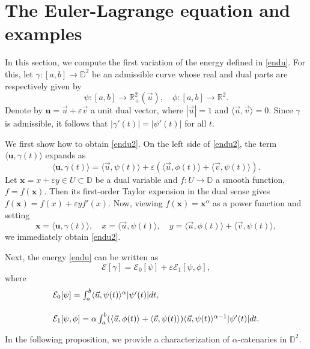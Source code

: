 \documentclass[a4paper,12pt]{amsart}
\theoremstyle{definition}
\def\r{\mathbb R}
\def\d{\mathsf d}
\def\d{\mathbb D}
\begin{document}
\section{The Euler-Lagrange equation and examples}\label{sec2}

In this section, we compute the first variation of the energy defined in \eqref{endu}. For this, let $\gamma:[a,b]\to\d^2$ be an admissible curve whose real and dual parts are respectively given by
$$
\psi:[a,b]\to\r^2_+(\vec{u}), \quad \phi:[a,b]\to\r^2. 
$$ 
Denote by $\mathbf{u}=\vec{u}+\varepsilon\vec{v}$ a unit dual vector, where $|\vec{u}|=1$ and $\langle \vec{u},\vec{v}\rangle=0$. Since $\gamma$ is admissible, it follows that $|\gamma'(t)|=|\psi'(t)|$ for all $t$. 

We first show how to obtain \eqref{endu2}. On the left side of \eqref{endu2}, the term $ \langle \mathbf{u},\gamma(t)\rangle
$ expands as
$$
\langle \mathbf{u},\gamma(t)\rangle=\langle\vec{u},\psi(t)\rangle +\varepsilon(\langle \vec{u},\phi(t)\rangle+\langle \vec{v},\psi(t)\rangle).
$$  
Let $\mathbf{x}=x+\varepsilon y \in U \subset \d$ be a dual variable and $f:U\to \d$ a smooth function, $f=f(\mathbf{x})$. Then its first-order Taylor expension in the dual sense gives $f(\mathbf{x})=f(x)+\varepsilon y f'(x)$. Now, viewing $f(\mathbf{x})=\mathbf{x}^\alpha$ as a power function and setting
$$
\mathbf{x}=\langle \mathbf{u},\gamma(t)\rangle, \quad x=\langle\vec{u},\psi(t)\rangle, \quad y=\langle \vec{u},\phi(t)\rangle+\langle \vec{v},\psi(t)\rangle,
$$
we immediately obtain \eqref{endu2}.

Next, the energy \eqref{endu} can be written as
$$
\mathcal{E}[\gamma]=\mathcal{E}_0[\psi]+\varepsilon\mathcal{E}_1[\psi,\phi],
$$
where
\begin{equation} \label{endu1}
\begin{array}{l}\vspace{.5cm}
\mathcal{E}_0[\psi]=\int_a^b \langle \vec{u},\psi(t)\rangle^\alpha |\psi'(t)|dt,\\
\mathcal{E}_1[\psi,\phi]=\alpha \int_a^b (\langle \vec{u},\phi(t)\rangle+\langle \vec{v},\psi(t)\rangle)\langle\vec{u},\psi(t)\rangle^{\alpha-1} |\psi'(t)|dt.
\end{array}
\end{equation}

In the following proposition, we provide a characterization of $\alpha$-catenaries in $\d^2$.
\end{document}
